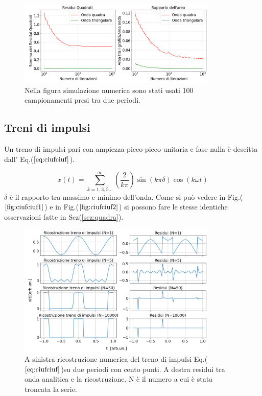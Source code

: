 \documentclass{article}
\begin{document}
      

        \begin{figure}[H]
            \centering
            \includegraphics[width=0.85\textwidth]{residuals2.png} %
            \caption{Nella figura simulazione numerica sono stati usati 100 campionamenti presi tra due periodi.}
            \label{fig:res2}
        \end{figure}

    \subsection{Treni di impulsi}
    Un treno di impulsi pari con ampiezza picco-picco unitaria e fase nulla è descitta
    dall' Eq.($\ref{eq:ciufciuf}$).

    \begin{equation}
        x(t) = \sum_{k=1,3,5...}^{\infty} \left(\frac{2}{k\pi}\right)\sin\left(k\pi\delta\right)\cos\left(k\omega t\right)
        \label{eq:ciufciuf}
    \end{equation}
    $\delta$ è il rapporto tra massimo e minimo dell'onda.
    Come si può vedere in Fig.($\ref{fig:ciufciuf1} $) e in Fig.($\ref{fig:ciufciuf2} $)
    si possono fare le stesse identiche osservazioni fatte in Sez(\ref{sez:quadra}).
    \begin{figure}[H]
        \centering
        \includegraphics[width=0.85\textwidth]{foupulsetrainwave1e2.png} %
        \caption{A sinistra ricostruzione numerica del treno di impulsi
        Eq.($\ref{eq:ciufciuf}$)su due periodi con cento punti.
        A destra residui tra onda analitica e la ricostruzione.
        N è il numero a cui è stata troncata la serie. }
        \label{fig:ciufciuf1}
    \end{figure}
\end{document}
